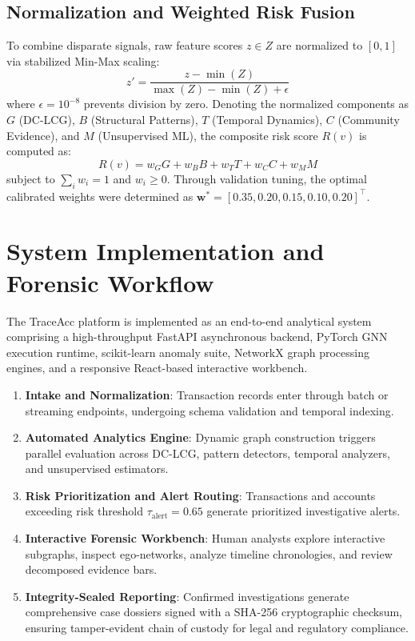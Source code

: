 \documentclass[journal]{IEEEtran}
\begin{document}
\subsection{Normalization and Weighted Risk Fusion}
To combine disparate signals, raw feature scores $z \in Z$ are normalized to $[0, 1]$ via stabilized Min-Max scaling:
\begin{equation}
z' = \frac{z - \min(Z)}{\max(Z) - \min(Z) + \epsilon}
\end{equation}
where $\epsilon = 10^{-8}$ prevents division by zero. Denoting the normalized components as $G$ (DC-LCG), $B$ (Structural Patterns), $T$ (Temporal Dynamics), $C$ (Community Evidence), and $M$ (Unsupervised ML), the composite risk score $R(v)$ is computed as:
\begin{equation}
R(v) = w_G G + w_B B + w_T T + w_C C + w_M M
\label{eq:fusion}
\end{equation}
subject to $\sum_{i} w_i = 1$ and $w_i \ge 0$. Through validation tuning, the optimal calibrated weights were determined as $\mathbf{w}^* = [0.35, 0.20, 0.15, 0.10, 0.20]^\top$.

\section{System Implementation and Forensic Workflow}
\label{sec:workflow}

The TraceAcc platform is implemented as an end-to-end analytical system comprising a high-throughput FastAPI asynchronous backend, PyTorch GNN execution runtime, scikit-learn anomaly suite, NetworkX graph processing engines, and a responsive React-based interactive workbench.

\begin{enumerate}
    \item \textbf{Intake and Normalization}: Transaction records enter through batch or streaming endpoints, undergoing schema validation and temporal indexing.
    \item \textbf{Automated Analytics Engine}: Dynamic graph construction triggers parallel evaluation across DC-LCG, pattern detectors, temporal analyzers, and unsupervised estimators.
    \item \textbf{Risk Prioritization and Alert Routing}: Transactions and accounts exceeding risk threshold $\tau_{\text{alert}} = 0.65$ generate prioritized investigative alerts.
    \item \textbf{Interactive Forensic Workbench}: Human analysts explore interactive subgraphs, inspect ego-networks, analyze timeline chronologies, and review decomposed evidence bars.
    \item \textbf{Integrity-Sealed Reporting}: Confirmed investigations generate comprehensive case dossiers signed with a SHA-256 cryptographic checksum, ensuring tamper-evident chain of custody for legal and regulatory compliance.
\end{enumerate}
\end{document}
